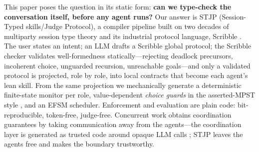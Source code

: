 \documentclass{article}
\newcommand{\stjp}{\textsc{STJP}}
\begin{document}
This paper poses the question in its static form: \textbf{can we type-check the conversation itself, before any agent runs?} Our answer is \stjp{} (Session-Typed skills/Judge Protocol), a compiler pipeline built on two decades of multiparty session type theory \citep{hyc08,scalas19} and its industrial protocol language, Scribble \citep{scribble}. The user states an intent; an LLM drafts a Scribble global protocol; the Scribble checker validates well-formedness statically---rejecting deadlock precursors, incoherent choice, unguarded recursion, unreachable goals---and only a validated protocol is projected, role by role, into local contracts that become each agent's lean skill. From the same projection we mechanically generate a deterministic finite-state monitor per role, value-dependent \emph{choice guards} in the asserted-MPST style \citep{bocchi10}, and an EFSM scheduler. Enforcement and evaluation are plain code: bit-reproducible, token-free, judge-free. Concurrent work obtains coordination guarantees by taking communication away from the agents---the coordination layer is generated as trusted code around opaque LLM calls \citep{bollig26}; \stjp{} leaves the agents free and makes the boundary trustworthy.
\end{document}

